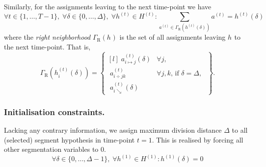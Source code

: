 \documentclass[a4paper]{article}
\newcommand{\set}[1]{\ensuremath{\{#1\}}}
\newcommand{\hypset}[1]{\ensuremath{H^{(#1)}}\xspace}
\newcommand{\vhset}[1]{\hypset{#1}}
\newcommand{\Ht}[1][t]{\vhset{#1}}
\newcommand{\vh}[1][]{\ensuremath{h_{#1}}\xspace}
\newcommand{\vht}[1][t]{\ensuremath{h^{(#1)}}\xspace}
\newcommand{\vhtd}[2][t]{\ensuremath{h^{(#1)}\left({#2}\right)}\xspace}
\newcommand{\vhtid}[3][t]{\ensuremath{h^{(#1)}_{#2}\left({#3}\right)}\xspace}
\newcommand{\vat}[1][t]{\ensuremath{a^{(#1)}}\xspace}
\newcommand{\vamd}[4]{\ensuremath{a^{(#1)}_{#2\mapsto#3}\left(#4\right)}\xspace}
\newcommand{\vad}[3]{\ensuremath{a^{(#1)}_{#2\div#3}}\xspace}
\newcommand{\vaed}[3]{\ensuremath{a^{(#1)}_{#2\searrow}\left(#3\right)}\xspace}
\newcommand{\Gr}[1]{\ensuremath{\Gamma_{\text{R}}\left(#1\right)}\xspace}
\begin{document}
\noindent
Similarly, for the assignments leaving to the next time-point we have
\begin{equation}\label{eq:contexit}
  \forall t \in \set{1, \dots, T-1},\;
  \forall \delta \in \set{0,\dots,\Delta},\;
  \forall \vht \in \Ht:
    \sum_{\vat \in \Gr{\vhtd{\delta}}} \vat
  = \vhtd{\delta}
\end{equation}
where the \emph{right neighborhood} \Gr{\vh} is the set of all assignments leaving \vh to the next time-point.
That is,
\begin{equation}
	\Gr{\vhtid{i}{\delta}}
	= \begin{Bmatrix*}[l]
			\; \vamd{t}{i}{j}{\delta}   & \forall j, \\[4mm]
			\; \vad{t}{i}{jk}           & \forall j, k \text{, if } \delta = \Delta,\; \\[4mm]
			\; \vaed{t}{i}{\delta} & 
		\end{Bmatrix*}.
\end{equation}
%
%
\subsubsection{Initialisation constraints.}
%
%
Lacking any contrary information, we assign maximum division distance $\Delta$ to all (selected) segment hypothesis in time-point $t = 1$. This is realised by forcing all other segmentation variables to $0$.
\begin{equation}
	\forall \delta \in \set{0,\dots,\Delta-1},\;
	\forall \vht[1] \in \Ht[1]:
		\vhtd[1]{\delta} = 0
\end{equation}
\end{document}
